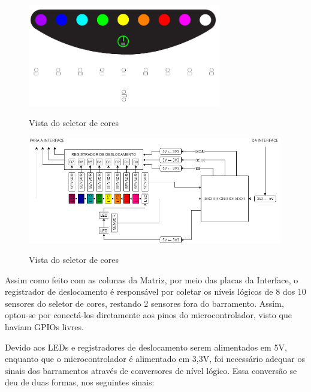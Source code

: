 \begin{figure}[H]
    \centering
    \caption{Vista do seletor de cores}
    \includegraphics[width=0.75\textwidth]{./dados/figuras/seletor-cores}
    \label{fig:seletor-cores}
\end{figure}

\begin{figure}[H]
    \centering
    \caption{Vista do seletor de cores}
    \includegraphics[width=0.99\textwidth]{./dados/figuras/diagrama-seletor-cores}
    \label{fig:diagrama-seletor-cores}
\end{figure}

Assim como feito com as colunas da Matriz, por meio das placas da Interface, o registrador de deslocamento é responsável por coletar os níveis lógicos de 8 dos 10 sensores do seletor de cores, restando 2 sensores fora do barramento. Assim, optou-se por conectá-los diretamente aos pinos do microcontrolador, visto que haviam GPIOs livres.

Devido aos LEDs e registradores de deslocamento serem alimentados em 5V, enquanto que o microcontrolador é alimentado em 3,3V, foi necessário adequar os sinais dos barramentos através de conversores de nível lógico. Essa conversão se deu de duas formas, nos seguintes sinais:

